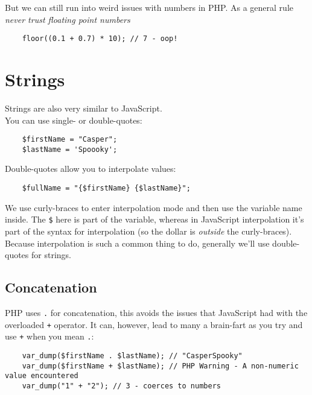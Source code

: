 But we can still run into weird issues with numbers in PHP. As a general rule \textit{never trust floating point numbers}

\begin{verbatim}
    floor((0.1 + 0.7) * 10); // 7 - oop!
\end{verbatim}


\section{Strings}

Strings are also very similar to JavaScript.
\\

You can use single- or double-quotes:

\begin{verbatim}
    $firstName = "Casper";
    $lastName = 'Spoooky';
\end{verbatim}

Double-quotes allow you to interpolate values:

\begin{verbatim}
    $fullName = "{$firstName} {$lastName}";
\end{verbatim}

We use curly-braces to enter interpolation mode and then use the variable name inside. The \texttt{\$} here is part of the variable, whereas in JavaScript interpolation it's part of the syntax for interpolation (so the dollar is \textit{outside} the curly-braces).
\\

Because interpolation is such a common thing to do, generally we'll use double-quotes for strings.

\subsection{Concatenation}

PHP uses \texttt{.} for concatenation, this avoids the issues that JavaScript had with the overloaded \texttt{+} operator. It can, however, lead to many a brain-fart as you try and use \texttt{+} when you mean \texttt{.}:

\begin{verbatim}
    var_dump($firstName . $lastName); // "CasperSpooky"
    var_dump($firstName + $lastName); // PHP Warning - A non-numeric value encountered
    var_dump("1" + "2"); // 3 - coerces to numbers
\end{verbatim}

